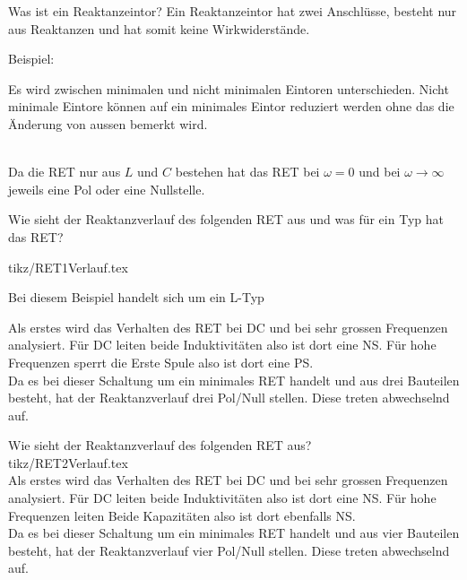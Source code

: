 
\begin{karte}{Was ist ein Reaktanzeintor?}
	Ein Reaktanzeintor hat zwei Anschlüsse, besteht nur aus Reaktanzen und hat somit keine Wirkwiderstände.
	\\[10pt]
	\begin{minipage}{0.32\textwidth}
		Beispiel:
		\scalebox{.8}{}
	\end{minipage}
	\begin{minipage}{0.65\textwidth}
		Es wird zwischen minimalen und nicht minimalen Eintoren unterschieden. Nicht minimale Eintore können auf ein minimales Eintor reduziert werden ohne das die Änderung von aussen bemerkt wird.
	\end{minipage}\\[10pt]
	Da die RET nur aus $L$ und $C$ bestehen hat das RET bei $\omega = 0$ und bei $\omega \rightarrow \infty$ jeweils eine Pol oder eine Nullstelle.
\end{karte}

\begin{karte}{Wie sieht der Reaktanzverlauf des folgenden RET aus und was für ein Typ hat das RET?\\[5pt]
	}
	\begin{minipage}{0.55\textwidth}
		 {tikz/RET1Verlauf.tex}
	\end{minipage}
	\begin{minipage}{0.4\textwidth}
		Bei diesem Beispiel handelt sich um ein L-Typ
	\end{minipage}

	Als erstes wird das Verhalten des RET bei DC und bei sehr grossen Frequenzen analysiert. Für DC leiten beide Induktivitäten also ist dort eine NS. Für hohe Frequenzen sperrt die Erste Spule also ist dort eine PS.\\
	Da es bei dieser Schaltung um ein minimales RET handelt und aus drei Bauteilen besteht, hat der Reaktanzverlauf drei Pol/Null stellen. Diese treten abwechselnd auf.
\end{karte}

\begin{karte}{Wie sieht der Reaktanzverlauf des folgenden RET aus?\\[5pt]
		}
	\centering
	 {tikz/RET2Verlauf.tex}\\
	\vspace{-5pt}
	\flushleft
	Als erstes wird das Verhalten des RET bei DC und bei sehr grossen Frequenzen analysiert. Für DC leiten beide Induktivitäten also ist dort eine NS. Für hohe Frequenzen leiten Beide Kapazitäten also ist dort ebenfalls NS.\\
	Da es bei dieser Schaltung um ein minimales RET handelt und aus vier Bauteilen besteht, hat der Reaktanzverlauf vier Pol/Null stellen. Diese treten abwechselnd auf.
\end{karte}

